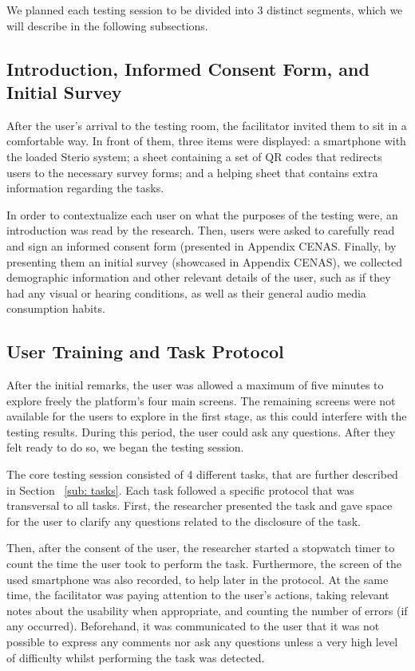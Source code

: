 We planned each testing session to be divided into 3 distinct segments, which we will describe in the following subsections.

\subsection{Introduction, Informed Consent Form, and Initial Survey}

After the user's arrival to the testing room, the facilitator invited them to sit in a comfortable way. In front of them, three items were displayed: a smartphone with the loaded Sterio system; a sheet containing a set of QR codes that redirects users to the necessary survey forms; and a helping sheet that contains extra information regarding the tasks.

In order to contextualize each user on what the purposes of the testing were, an introduction was read by the research. Then, users were asked to carefully read and sign an informed consent form (presented in Appendix CENAS. Finally, by presenting them an initial survey (showcased in Appendix CENAS), we collected demographic information and other relevant details of the user, such as if they had any visual or hearing conditions, as well as their general audio media consumption habits.

\subsection{User Training and Task Protocol}
\label{subsub:taskprot}

After the initial remarks, the user was allowed a maximum of five minutes to explore freely the platform's four main screens. The remaining screens were not available for the users to explore in the first stage, as this could interfere with the testing results. During this period, the user could ask any questions. After they felt ready to do so, we began the testing session.

The core testing session consisted of 4 different tasks, that are further described in Section ~\ref{sub: tasks}. Each task followed a specific protocol that was transversal to all tasks. First, the researcher presented the task and gave space for the user to clarify any questions related to the disclosure of the task.

Then, after the consent of the user, the researcher started a stopwatch timer to count the time the user took to perform the task. Furthermore, the screen of the used smartphone was also recorded, to help later in the protocol. At the same time, the facilitator was paying attention to the user's actions, taking relevant notes about the usability when appropriate, and counting the number of errors (if any occurred). Beforehand, it was communicated to the user that it was not possible to express any comments nor ask any questions unless a very high level of difficulty whilst performing the task was detected.

